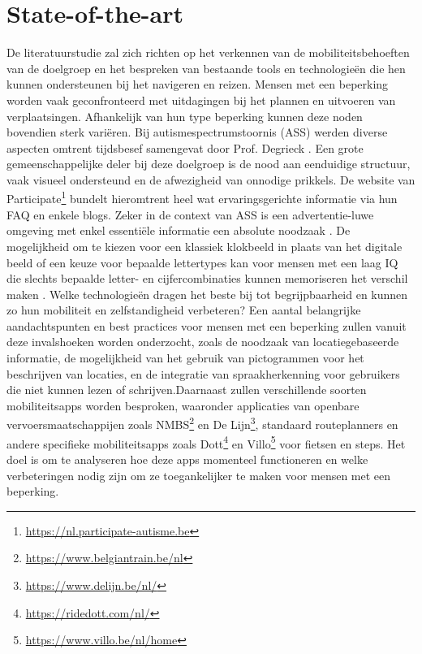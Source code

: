 
\section{State-of-the-art}%
\label{sec:state-of-the-art}
  
  De literatuurstudie zal zich richten op het verkennen van de mobiliteitsbehoeften van de doelgroep en het bespreken van bestaande tools en technologieën die hen kunnen ondersteunen bij het navigeren en reizen.
  Mensen met een beperking worden vaak geconfronteerd met uitdagingen bij het plannen en uitvoeren van verplaatsingen. Afhankelijk van hun type beperking kunnen deze noden bovendien sterk variëren. Bij autismespectrumstoornis (ASS) werden diverse aspecten omtrent tijdsbesef samengevat door Prof. Degrieck \autocite{Degrieck2014}.
  Een grote gemeenschappelijke deler bij deze doelgroep is de nood aan eenduidige structuur, vaak visueel ondersteund en de afwezigheid van onnodige prikkels. De website van Participate\footnote{\url{https://nl.participate-autisme.be}} bundelt hieromtrent heel wat ervaringsgerichte informatie via hun FAQ en enkele blogs. Zeker in de context van ASS is een advertentie-luwe omgeving met enkel essentiële informatie een absolute noodzaak \autocite{Roeyers2014}. 
  De mogelijkheid om te kiezen voor een klassiek klokbeeld in plaats van het digitale beeld of een keuze voor bepaalde lettertypes kan voor mensen met een laag IQ die slechts bepaalde letter- en cijfercombinaties kunnen memoriseren het verschil maken \autocite{Uyttersprot2021,Tytgat2014,DeGraaf2001}. Welke technologieën dragen het beste bij tot begrijpbaarheid en kunnen zo hun mobiliteit en zelfstandigheid verbeteren?
  Een aantal belangrijke aandachtspunten en best practices voor mensen met een beperking zullen vanuit deze invalshoeken worden onderzocht, zoals de noodzaak van locatiegebaseerde informatie, de mogelijkheid van het gebruik van pictogrammen voor het beschrijven van locaties, en de integratie van spraakherkenning voor gebruikers die niet kunnen lezen of schrijven.Daarnaast zullen verschillende soorten mobiliteitsapps worden besproken, waaronder applicaties van openbare vervoersmaatschappijen zoals NMBS\footnote{\url{https://www.belgiantrain.be/nl}} en De Lijn\footnote{\url{https://www.delijn.be/nl/}}, standaard routeplanners en andere specifieke mobiliteitsapps zoals Dott\footnote{\url{https://ridedott.com/nl/}} en Villo\footnote{\url{https://www.villo.be/nl/home}} voor fietsen en steps. Het doel is om te analyseren hoe deze apps momenteel functioneren en welke verbeteringen nodig zijn om ze toegankelijker te maken voor mensen met een beperking.
